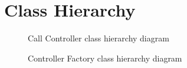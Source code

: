 \section{Class Hierarchy}

\begin{figure}[!hbtp]
\centering
{}
\caption{Call Controller class hierarchy diagram}
\label{fig:CallControllerClassHierarchyDiagram}
\end{figure}

\begin{figure}[!hbtp]
\centering
{}
\caption{Controller Factory class hierarchy diagram}
\label{fig:ControllerFactoryClassHierarchyDiagram}
\end{figure}



